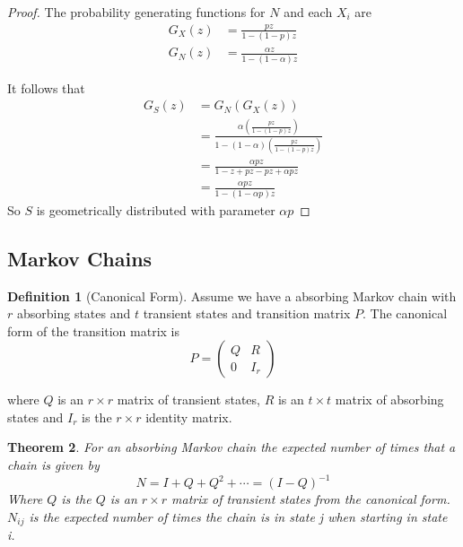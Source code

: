 \documentclass{article}
\theoremstyle{plain}
\newtheorem{theorem}{Theorem}[section]
\theoremstyle{definition}
\newtheorem{defn}[theorem]{Definition}
\theoremstyle{remark}
\begin{document}
\begin{proof}\cite{Nelson1995}
The probability generating functions for $N$ and each $X_i$ are
\begin{align*}
    G_X(z) &= \frac{p z}{1 - (1 - p)z}\\
    G_{N}(z) &= \frac{\alpha z}{1 - (1 - \alpha)z}
\end{align*}

It follows that
\begin{align*}
    G_S(z) &= G_N(G_X(z))\\
    &= \frac{
    \alpha \left( \frac{p z}{1 - (1 - p)z} \right)
    }{
        1 - (1 - \alpha) \left( \frac{p z}{1 - (1 - p)z} \right)
    }\\
    &= \frac{
        \alpha p z
    }{
        1 - z + pz - pz + \alpha p z
    } \\
    &= \frac{
        \alpha p z
    }{
        1 - (1 - \alpha p) z
    }
\end{align*}
So $S$ is geometrically distributed with parameter $\alpha p$
\end{proof}

\subsection{Markov Chains}

\begin{defn}[Canonical Form] \cite{grinstead2003}
Assume we have a absorbing Markov chain with $r$ absorbing states and $t$ transient states and  transition matrix $P$.
The canonical form of the transition matrix is
\begin{equation}
    P = \begin{pmatrix}
        Q & R\\
        0 & I_{r}
    \end{pmatrix}
\end{equation}

where $Q$ is an $r \times r$ matrix of transient states, $R$ is an $t \times t$ matrix of absorbing states and $I_{r}$ is the $r \times r$ identity matrix.
\end{defn}

\begin{theorem} \label{thm:fund_exp} \cite{grinstead2003}
For an absorbing Markov chain the expected number of times that a chain is given by
\begin{equation}
    N = I + Q + Q^2 + \cdots = (I - Q)^{-1}
\end{equation}
Where $Q$ is the $Q$ is an $r \times r$ matrix of transient states from the canonical form.
$N_{ij}$ is the expected number of times the chain is in state j when starting in state i.
\end{theorem}
\end{document}
